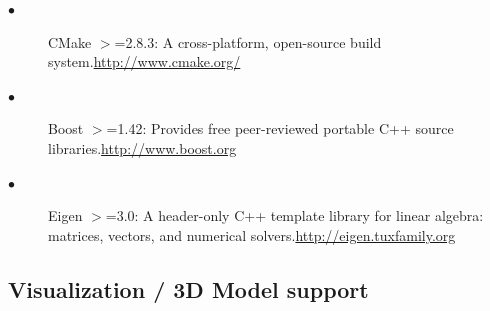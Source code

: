 \documentclass{book}
\begin{document}
\begin{description}
\item[$\bullet$ ] CMake $>$=2.8.3: A cross-platform, open-source build system.\hyperref[cmake]{http://www.cmake.org/} 
\item[$\bullet$ ] Boost $>$=1.42: Provides free peer-reviewed portable C++ source libraries.\hyperref[boost]{http://www.boost.org} 
\item[$\bullet$ ] Eigen $>$=3.0: A header-only C++ template library for linear algebra: matrices, vectors, and numerical solvers.\hyperref[Eigen]{http://eigen.tuxfamily.org} 
\end{description}
\subsection{Visualization / 3D Model support}
\setcounter{MyCounter}{1}%
\end{document}
